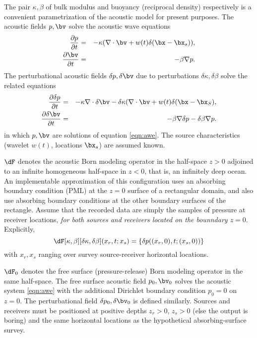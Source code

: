 The pair $\kappa,\beta$ of bulk modulus and buoyancy (reciprocal
density) respectively is a convenient parametrization of the acoustic
model for present purposes. The acoustic fields $p,\bv$ solve the
acoustic wave equations
\begin{eqnarray}
\label{eqn:awe}
\frac{\partial p}{\partial t}& =& -\kappa (\nabla \cdot \bv +
w(t)\delta(\bx-\bx_s)),\nonumber \\
\frac{\partial \bv}{\partial t} & = & -\beta \nabla p. 
\end{eqnarray}  
The perturbational acoustic fields $\delta p, \delta \bv$ due to
perturbations $\delta \kappa, \delta \beta$ solve the
related equations 
\begin{eqnarray}
\label{eqn:pawe}
\frac{\partial \delta p}{\partial t}& =& -\kappa \nabla \cdot \delta \bv -
\delta \kappa (\nabla \cdot \bv + w(t)\delta(\bx-\bx_S),\nonumber \\
\frac{\partial \delta \bv}{\partial t} & = & -\beta \nabla \delta p - \delta
                                      \beta \nabla p. 
\end{eqnarray}  
in which $p,\bv$ are solutions of equation \ref{eqn:awe}.
The source characteristics (wavelet $w(t)$, locations $\bx_s$) are
assumed known. 

$\dF$ denotes the acoustic Born modeling operator in the half-space $z>0$
adjoined to an infinite homogeneous half-space in $z<0$, that is, an
infinitely deep ocean. An implementable approximation of this
configuration uses an
absorbing boundary condition (PML) at the $z=0$ surface of a
rectangular domain, and also use absorbing boundary conditions at the
other boundary surfaces of the rectangle. Assume that the recorded
data are simply the samples of pressure at receiver
locations, {\em for both sources and receivers located on the
  bounndary $z=0$}. Explicitly,
\[
\dF[\kappa,\beta][\delta \kappa,\delta \beta](x_r,t;x_s) = \{\delta p((x_r,0),t;(x_s,0))\}
\]
with $x_r, x_s$ ranging over survey source-receiver horizontal
locations. 

$\dF_0$ denotes the free surface (pressure-release) Born modeling operator in
the same half-space. The free surface acoustic field $p_0,\bv_0$ solves
the acoustic system \ref{eqn:awe} with the additional
Dirichlet boundary condition $p_0=0$ on $z=0$. The perturbational
field $\delta p_0,\delta \bv_0$ is defined similarly. Sources and receivers
must be positioned at positive depths $z_r>0$, $z_s>0$ (else the
output is boring) 
and the same horizontal locations as the hypothetical
absorbing-surface survey. 

